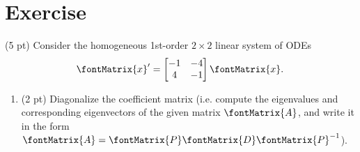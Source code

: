 %
%
%
\section{Exercise}

(5 pt) Consider the homogeneous 1st-order $2 \times 2$ linear system of ODEs
\begin{align}
\fontMatrix{x}'
=
\begin{bmatrix}%
-1	&	-4	\\
4	&	-1
\end{bmatrix}%
\fontMatrix{x}.%
\label{eq : Quiz21 ODE}
\end{align}
\begin{enumerate}[label=(\alph*)]
\item (2 pt) Diagonalize the coefficient matrix (i.e. compute the eigenvalues and corresponding eigenvectors of the given matrix $\fontMatrix{A}$, and write it in the form $\fontMatrix{A} = \fontMatrix{P} \fontMatrix{D} \fontMatrix{P}^{-1}$).
\end{enumerate}

